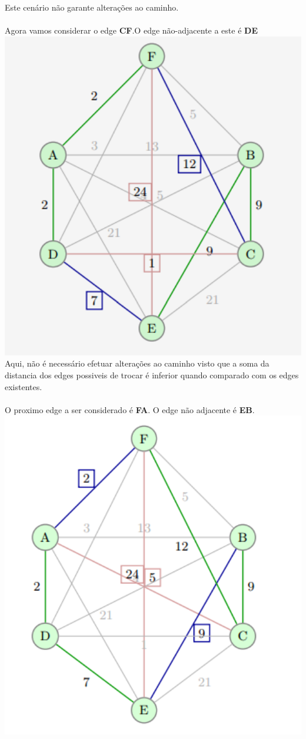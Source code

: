 \documentclass[12pt,a4paper,portrait]{article}
\begin{document}
			Este cenário não garante alterações ao caminho.\\\\
			\newpage
			Agora vamos considerar o edge \textbf{CF}.O edge não-adjacente a este é \textbf{DE}\\
			\includegraphics[width=1.0\textwidth]{imagens/7}
			Aqui, não é necessário efetuar alterações ao caminho visto que a soma da distancia dos edges possiveis de trocar é inferior quando comparado com os edges existentes.\\\\
			\newpage
			O proximo edge a ser considerado é  \textbf{FA}. O edge não adjacente é \textbf{EB}.\\
			\includegraphics[width=1.0\textwidth]{imagens/8}
\end{document}
